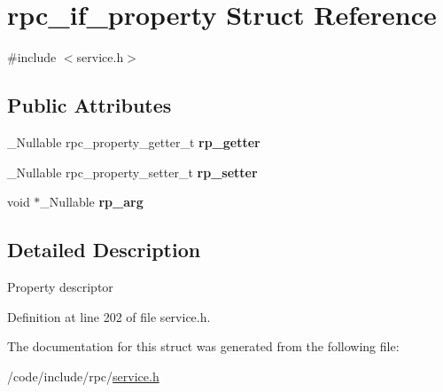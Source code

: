 \hypertarget{structrpc__if__property}{}\section{rpc\+\_\+if\+\_\+property Struct Reference}
\label{structrpc__if__property}


{\ttfamily \#include $<$service.\+h$>$}

\subsection*{Public Attributes}
\begin{DoxyCompactItemize}
\item 
\+\_\+\+Nullable rpc\+\_\+property\+\_\+getter\+\_\+t {\bfseries rp\+\_\+getter}\hypertarget{structrpc__if__property_a2b294c7fed3665f1a58020040ec13aee}{}\label{structrpc__if__property_a2b294c7fed3665f1a58020040ec13aee}

\item 
\+\_\+\+Nullable rpc\+\_\+property\+\_\+setter\+\_\+t {\bfseries rp\+\_\+setter}\hypertarget{structrpc__if__property_a02e1f9e6e5680714278ed6dd67987d67}{}\label{structrpc__if__property_a02e1f9e6e5680714278ed6dd67987d67}

\item 
void $\ast$\+\_\+\+Nullable {\bfseries rp\+\_\+arg}\hypertarget{structrpc__if__property_a81d2953a7a4bdff1775330c29992546b}{}\label{structrpc__if__property_a81d2953a7a4bdff1775330c29992546b}

\end{DoxyCompactItemize}


\subsection{Detailed Description}
Property descriptor 

Definition at line 202 of file service.\+h.



The documentation for this struct was generated from the following file\+:\begin{DoxyCompactItemize}
\item 
/code/include/rpc/\hyperlink{service_8h}{service.\+h}\end{DoxyCompactItemize}
